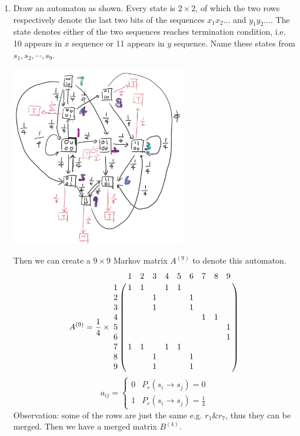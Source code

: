 \documentclass[12pt,a4]{article}
\begin{document}
\begin{solution} \quad
  \begin{enumerate}
    \item
  Draw an automaton as shown. Every state is $2 \times 2$, of which the two rows respectively denote the last two bits of the sequences $x_1 x_2 \dots$ and $y_1 y_2 \dots$. The state {\color{red}{T}} denotes either of the two sequences reaches termination condition, i.e. 10 appears in $x$ sequence or 11 appears in $y$ sequence. Name these states from $s_1, s_2, \cdots, s_9$.\par
  \begin{center}
    \includegraphics[width=0.6\textwidth]{figures/e33_p1.jpg}
  \end{center}
  Then we can create a $9 \times 9$ Markov matrix $A^{(9)}$ to denote this automaton.
  $$
  A^{(9)} = \frac{1}{4} \times 
  \bordermatrix{&1 &2 &3 &4 &5 &6 &7 &8 &9 \cr
              1 &1 &1 &  &1 &1 &  &  &  &  \cr
              2 &  &  &1 &  &  &1 &  &  &  \cr
              3 &  &  &1 &  &  &1 &  &  &  \cr
              4 &  &  &  &  &  &  &1 &1 &  \cr
              5 &  &  &  &  &  &  &  &  &1 \cr
              6 &  &  &  &  &  &  &  &  &1 \cr
              7 &1 &1 &  &1 &1 &  &  &  &  \cr
              8 &  &  &1 &  &  &1 &  &  &  \cr
              9 &  &  &1 &  &  &1 &  &  &  \cr
  }
  $$
  $$a_{ij} = 
  \begin{cases}
  0 & P_r(s_i \rightarrow s_j) = 0 \\
  1 & P_r(s_i \rightarrow s_j) = \frac{1}{4}
  \end{cases}$$
  Observation: some of the rows are just the same e.g. $r_1 \& r_7$, thus they can be merged. Then we have a merged matrix $B^{(4)}$.

\end{enumerate}
\end{solution}
\end{document}
